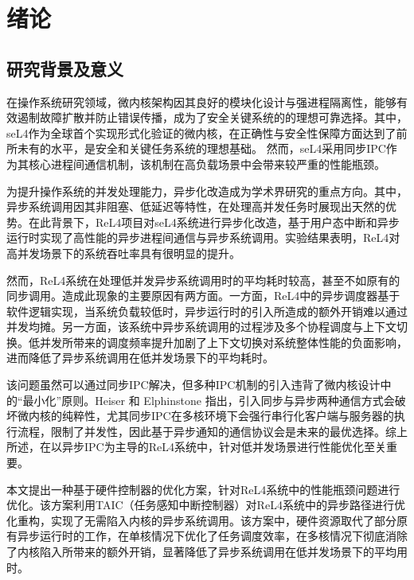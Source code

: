 \chapter{绪论}

\section{研究背景及意义}

在操作系统研究领域，微内核架构因其良好的模块化设计与强进程隔离性，能够有效遏制故障扩散并防止错误传播，成为了安全关键系统的的理想可靠选择\cite{nandy2024resource}。其中，seL4作为全球首个实现形式化验证的微内核，在正确性与安全性保障方面达到了前所未有的水平，是安全和关键任务系统的理想基础\cite{heiser2025fastsecureadaptablelionsos}。
然而，seL4采用同步IPC作为其核心进程间通信机制，该机制在高负载场景中会带来较严重的性能瓶颈\cite{mergendahl2022thundering}。

为提升操作系统的并发处理能力，异步化改造成为学术界研究的重点方向。其中，异步系统调用因其非阻塞、低延迟等特性，在处理高并发任务时展现出天然的优势。在此背景下，ReL4项目\cite{rel4_kernel}对seL4系统进行异步化改造，基于用户态中断和异步运行时实现了高性能的异步进程间通信与异步系统调用。实验结果表明，ReL4对高并发场景下的系统吞吐率具有很明显的提升。

然而，ReL4系统在处理低并发异步系统调用时的平均耗时较高，甚至不如原有的同步调用。造成此现象的主要原因有两方面。一方面，ReL4中的异步调度器基于软件逻辑实现，当系统负载较低时，异步运行时的引入所造成的额外开销难以通过并发均摊。另一方面，该系统中异步系统调用的过程涉及多个协程调度与上下文切换。低并发所带来的调度频率提升加剧了上下文切换对系统整体性能的负面影响，进而降低了异步系统调用在低并发场景下的平均耗时。

该问题虽然可以通过同步IPC解决，但多种IPC机制的引入违背了微内核设计中的“最小化”原则\cite{liedtke}。Heiser 和 Elphinstone 指出，引入同步与异步两种通信方式会破坏微内核的纯粹性，尤其同步IPC在多核环境下会强行串行化客户端与服务器的执行流程，限制了并发性，因此基于异步通知的通信协议会是未来的最优选择\cite{heiser2013from}。综上所述，在以异步IPC为主导的ReL4系统中，针对低并发场景进行性能优化至关重要。

本文提出一种基于硬件控制器的优化方案，针对ReL4系统中的性能瓶颈问题进行优化。该方案利用TAIC（任务感知中断控制器）对ReL4系统中的异步路径进行优化重构，实现了无需陷入内核的异步系统调用。该方案中，硬件资源取代了部分原有异步运行时的工作，在单核情况下优化了任务调度效率，在多核情况下彻底消除了内核陷入所带来的额外开销，显著降低了异步系统调用在低并发场景下的平均用时。

